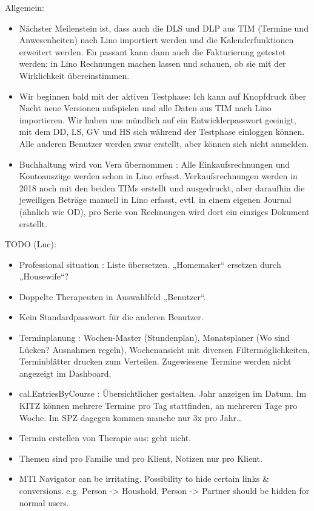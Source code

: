 \documentclass[letterpaper,10pt,ngerman]{sphinxmanual}
\begin{document}
Allgemein:
\begin{itemize}
\item {} 
Nächster Meilenstein ist, dass auch die DLS und DLP aus TIM (Termine
und Anwesenheiten) nach Lino importiert werden und die
Kalenderfunktionen erweitert werden.  En passant kann dann auch die
Fakturierung getestet werden: in Lino Rechnungen machen lassen und
schauen, ob sie mit der Wirklichkeit übereinstimmen.

\item {} 
Wir beginnen bald mit der aktiven Testphase: Ich kann auf Knopfdruck
über Nacht neue Versionen aufspielen und alle Daten aus TIM nach
Lino importieren. Wir haben uns mündlich auf ein Entwicklerpasswort
geeinigt, mit dem DD, LS, GV und HS sich während der Testphase
einloggen können.  Alle anderen Benutzer werden zwar erstellt, aber
können sich nicht anmelden.

\item {} 
Buchhaltung wird von Vera übernommen : Alle Einkaufsrechnungen und
Kontoauszüge werden schon in Lino erfasst.  Verkaufsrechnungen
werden in 2018 noch mit den beiden TIMs erstellt und ausgedruckt,
aber daraufhin die jeweiligen Beträge manuell in Lino erfasst,
evtl. in einem eigenen Journal (ähnlich wie OD), pro Serie von
Rechnungen wird dort ein einziges Dokument erstellt.

\end{itemize}

TODO (Luc):
\begin{itemize}
\item {} 
Professional situation : Liste übersetzen. „Homemaker“ ersetzen
durch „Housewife“?

\item {} 
Doppelte Therapeuten in Auswahlfeld „Benutzer“.

\item {} 
Kein Standardpasswort für die anderen Benutzer.

\item {} 
Terminplanung : Wochen-Master (Stundenplan), Monatsplaner (Wo sind
Lücken? Ausnahmen regeln), Wochenansicht mit diversen
Filtermöglichkeiten, Terminblätter drucken zum
Verteilen. Zugewiesene Termine werden nicht angezeigt im Dashboard.

\item {} 
cal.EntriesByCourse : Übersichtlicher gestalten.  Jahr anzeigen im
Datum.  Im KITZ können mehrere Termine pro Tag stattfinden, an
mehreren Tage pro Woche.  Im SPZ dagegen kommen manche nur 3x pro
Jahr…

\item {} 
Termin erstellen von Therapie aus: geht nicht.

\item {} 
Themen sind pro Familie und pro Klient, Notizen nur pro Klient.

\item {} 
MTI Navigator can be irritating. Possibility to hide certain links \&
conversions. e.g. Person -\textgreater{} Houshold, Person -\textgreater{} Partner should be
hidden for normal users.

\end{itemize}
\end{document}

